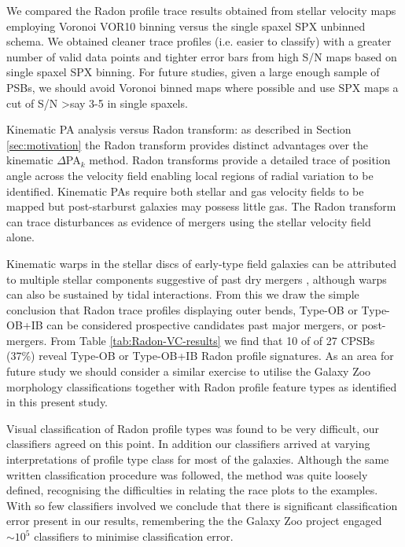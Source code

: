 We compared the Radon profile trace results obtained from stellar velocity maps employing Voronoi VOR10 binning versus the single spaxel SPX unbinned schema. We obtained cleaner trace profiles (i.e. easier to classify) with a greater number of valid data points and tighter error bars from high S/N maps based on single spaxel SPX binning. For future studies, given a large enough sample of PSBs, we should avoid Voronoi binned maps where possible and use SPX maps a cut of S/N \textgreater say 3-5 in single spaxels.

Kinematic PA analysis versus Radon transform: as described in Section \ref{sec:motivation} the Radon transform provides distinct advantages over the kinematic $\Delta$PA$_{k}$  method. Radon transforms provide a detailed trace of position angle across the velocity field enabling local regions of radial variation to be identified. Kinematic PAs require both stellar and gas velocity fields to be mapped but post-starburst galaxies may possess little gas. The Radon transform can trace disturbances as evidence of mergers using the stellar velocity field alone.

Kinematic warps in the stellar discs of early-type field galaxies can be attributed to multiple stellar components suggestive of past dry mergers \citep{2005AJ....130.2647V}, although warps can also be sustained by tidal interactions.
From this we draw the simple conclusion that Radon trace profiles displaying outer bends, Type-OB or Type-OB+IB can be considered prospective candidates past major mergers, or post-mergers. From Table \ref{tab:Radon-VC-results} we find that 10 of of 27 CPSBs (37\%) reveal Type-OB or Type-OB+IB Radon profile signatures. As an area for future study we should consider a similar exercise to utilise the Galaxy Zoo morphology classifications together with Radon profile feature types as identified in this present study. 

Visual classification of Radon profile types was found to be very difficult, our classifiers agreed on this point. In addition our classifiers arrived at varying interpretations of profile type class for most of the galaxies. Although the same written classification procedure was followed, the method was quite loosely defined, recognising the difficulties in relating the race plots to the examples. With so few classifiers involved we conclude that there is significant classification error present in our results, remembering the the Galaxy Zoo project engaged $\sim10^5$ classifiers to minimise classification error.

